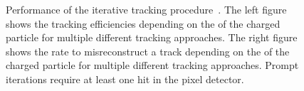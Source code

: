 \begin{figure}[htbp!]
  \begin{center}
\caption{Performance of the iterative tracking procedure~\cite{Sirunyan:2017ulk}. The left figure shows the tracking efficiencies depending on the \pt of the charged particle for multiple different tracking approaches. 
         The right figure shows the rate to misreconstruct a track depending on the \pt of the charged particle for multiple different tracking approaches. Prompt iterations require at least one hit in the pixel detector.
  \label{fig:reco_trackingEff}}
  \end{center}
\end{figure}

